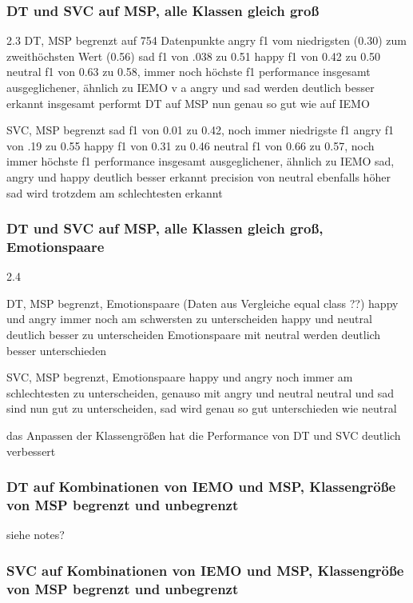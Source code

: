 \documentclass{article} %
\begin{document}
\subsubsection{DT und SVC auf MSP, alle Klassen gleich groß}

2.3
DT, MSP begrenzt auf 754 Datenpunkte
angry f1 vom niedrigsten (0.30) zum zweithöchsten Wert (0.56)
sad f1 von .038 zu 0.51
happy f1 von 0.42 zu 0.50
neutral f1 von 0.63 zu 0.58, immer noch höchste f1
performance insgesamt ausgeglichener, ähnlich zu IEMO
v a angry und sad werden deutlich besser erkannt
insgesamt performt DT auf MSP nun genau so gut wie auf IEMO

SVC, MSP begrenzt
sad f1 von 0.01 zu 0.42, noch immer niedrigste f1
angry f1 von .19 zu 0.55
happy f1 von 0.31 zu 0.46
neutral f1 von 0.66 zu 0.57, noch immer höchste f1
performance insgesamt ausgeglichener, ähnlich zu IEMO
sad, angry und happy deutlich besser erkannt
precision von neutral ebenfalls höher
sad wird trotzdem am schlechtesten erkannt

\subsubsection{DT und SVC auf MSP, alle Klassen gleich groß, Emotionspaare}

2.4

DT, MSP begrenzt, Emotionspaare (Daten aus Vergleiche equal class ??)
happy und angry immer noch am schwersten zu unterscheiden
happy und neutral deutlich besser zu unterscheiden
Emotionspaare mit neutral werden deutlich besser unterschieden

SVC, MSP begrenzt, Emotionspaare
happy und angry noch immer am schlechtesten zu unterscheiden, genauso mit angry und neutral
neutral und sad sind nun gut zu unterscheiden, sad wird genau so gut unterschieden wie neutral

das Anpassen der Klassengrößen hat die Performance von DT und SVC deutlich verbessert

\subsubsection{DT auf Kombinationen von IEMO und MSP, Klassengröße von MSP begrenzt und unbegrenzt}

siehe notes?

\subsubsection{SVC auf Kombinationen von IEMO und MSP, Klassengröße von MSP begrenzt und unbegrenzt}
\end{document}
